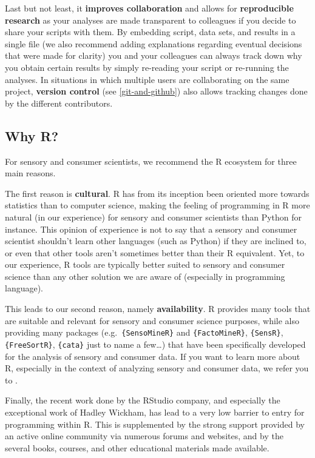 \documentclass[
]{krantz}
\begin{document}
Last but not least, it \textbf{improves collaboration} and allows for \textbf{reproducible research} as your analyses are made transparent to colleagues if you decide to share your scripts with them. By embedding script, data sets, and results in a single file (we also recommend adding explanations regarding eventual decisions that were made for clarity) you and your colleagues can always track down why you obtain certain results by simply re-reading your script or re-running the analyses. In situations in which multiple users are collaborating on the same project, \textbf{version control} (see \ref{git-and-github}) also allows tracking changes done by the different contributors.

\hypertarget{why-r}{%
\subsection{Why R?}\label{why-r}}

For sensory and consumer scientists, we recommend the R ecosystem for three main reasons.

The first reason is \textbf{cultural}. R has from its inception been oriented more towards statistics than to computer science, making the feeling of programming in R more natural (in our experience) for sensory and consumer scientists than Python for instance. This opinion of experience is not to say that a sensory and consumer scientist shouldn't learn other languages (such as Python) if they are inclined to, or even that other tools aren't sometimes better than their R equivalent. Yet, to our experience, R tools are typically better suited to sensory and consumer science than any other solution we are aware of (especially in programming language).

This leads to our second reason, namely \textbf{availability}. R provides many tools that are suitable and relevant for sensory and consumer science purposes, while also providing many packages (e.g.~\texttt{\{SensoMineR\}} and \texttt{\{FactoMineR\}}, \texttt{\{SensR\}}, \texttt{\{FreeSortR\}}, \texttt{\{cata\}} just to name a few\ldots) that have been specifically developed for the analysis of sensory and consumer data. If you want to learn more about R, especially in the context of analyzing sensory and consumer data, we refer you to \citet{Le2018}.

Finally, the recent work done by the RStudio company, and especially the exceptional work of Hadley Wickham, has lead to a very low barrier to entry for programming within R. This is supplemented by the strong support provided by an active online community via numerous forums and websites, and by the several books, courses, and other educational materials made available.
\end{document}
